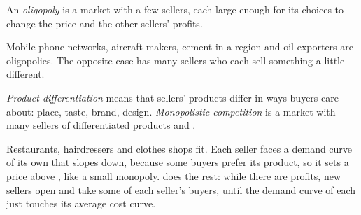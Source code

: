 \begin{definition}[Oligopoly]\label{def:g11:oligopoly-and-games:oligopoly}
An \emph{oligopoly} is a market with a few sellers, each large enough for its choices to change the price and the other sellers' profits.
\end{definition}

Mobile phone networks, aircraft makers, cement in a region and oil exporters are oligopolies. The opposite case has many sellers who each sell something a little
different.

\begin{definition}\label{def:g11:oligopoly-and-games:differentiation}
\emph{Product differentiation} means that sellers' products differ in ways buyers care about: place, taste, brand, design.
\emph{Monopolistic competition}\label{def:g11:oligopoly-and-games:monopolistic-competition} is a market with many
sellers of differentiated products and .
\end{definition}

Restaurants, hairdressers and clothes shops fit. Each seller faces a demand curve of its own that slopes down, because some buyers prefer its product, so it
sets a price above , like a small monopoly.  does the rest: while there are profits, new sellers open and take some of each seller's
buyers, until the demand curve of each just touches its average cost curve.


